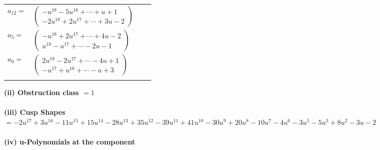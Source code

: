\documentclass[1p]{elsarticle_modified}
\theoremstyle{definition}
\begin{document}
\begin{tabular}{m{7pt} m{180pt} m{7pt} m{180pt} }
\flushright $a_{12}=$&$\begin{pmatrix}- u^{18}-5 u^{16}+\cdots+u+1\\-2 u^{18}+2 u^{17}+\cdots+3 u-2\end{pmatrix}$ \\
\flushright $a_{5}=$&$\begin{pmatrix}- u^{18}+2 u^{17}+\cdots+4 u-2\\u^{18}- u^{17}+\cdots-2 u-1\end{pmatrix}$ \\
\flushright $a_{9}=$&$\begin{pmatrix}2 u^{18}-2 u^{17}+\cdots-4 u+1\\- u^{17}+u^{16}+\cdots- u+3\end{pmatrix}$\\&\end{tabular}
\flushleft \textbf{(ii) Obstruction class $= 1$}\\~\\
\flushleft \textbf{(iii) Cusp Shapes $= -2 u^{17}+3 u^{16}-11 u^{15}+15 u^{14}-28 u^{13}+35 u^{12}-39 u^{11}+41 u^{10}-30 u^9+20 u^8-10 u^7-4 u^6-3 u^5-5 u^3+8 u^2-3 u-2$}\\~\\
\newpage\renewcommand{\arraystretch}{1}
\flushleft \textbf{(iv) u-Polynomials at the component}\newline \\
\end{document}
